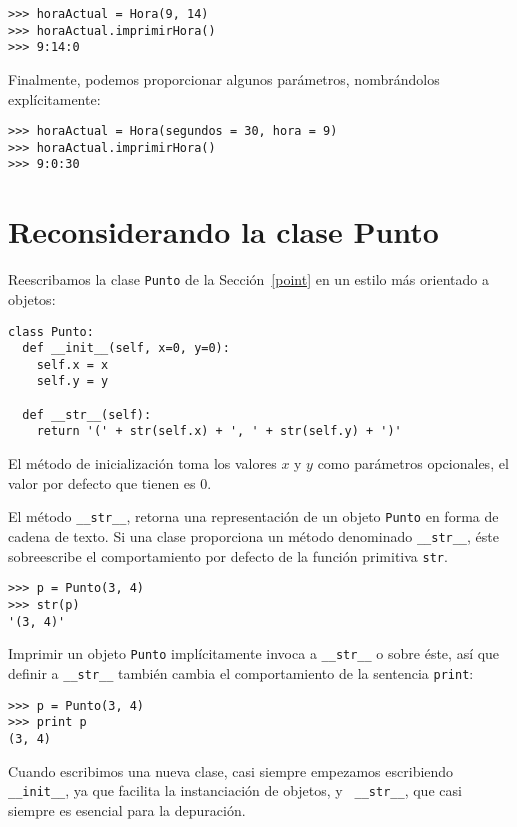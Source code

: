 \beforeverb
\begin{verbatim}
>>> horaActual = Hora(9, 14)
>>> horaActual.imprimirHora()
>>> 9:14:0
\end{verbatim}
\afterverb
%
Finalmente, podemos proporcionar algunos
parámetros, nombrándolos explícitamente:

\beforeverb
\begin{verbatim}
>>> horaActual = Hora(segundos = 30, hora = 9)
>>> horaActual.imprimirHora()
>>> 9:0:30
\end{verbatim}
\afterverb
%

\section{Reconsiderando la clase Punto}

Reescribamos la clase \texttt{Punto} de la Sección~\ref{point} 
en un estilo más orientado a objetos:

\beforeverb
\begin{verbatim}
class Punto:
  def __init__(self, x=0, y=0):
    self.x = x
    self.y = y

  def __str__(self):
    return '(' + str(self.x) + ', ' + str(self.y) + ')'
\end{verbatim}
\afterverb
%
El método de inicialización toma los valores  $x$ y $y$ como
parámetros opcionales, el valor por defecto que tienen es 0.

El método \texttt{\_\_str\_\_}, retorna una representación
de un objeto  \texttt{Punto} en forma de cadena de texto. Si
una clase proporciona un método denominado \texttt{\_\_str\_\_}, 
éste sobreescribe el comportamiento por defecto de la 
función primitiva  \texttt{str}.

\beforeverb
\begin{verbatim}
>>> p = Punto(3, 4)
>>> str(p)
'(3, 4)'
\end{verbatim}
\afterverb
%
Imprimir un objeto \texttt{Punto} implícitamente invoca a \texttt{\_\_str\_\_} o
sobre éste, así que definir a  \texttt{\_\_str\_\_} también cambia el 
comportamiento de la sentencia \texttt{print}:

\beforeverb
\begin{verbatim}
>>> p = Punto(3, 4)
>>> print p
(3, 4)
\end{verbatim}
\afterverb
%
Cuando escribimos una nueva clase, casi siempre empezamos escribiendo
 {\tt\_\_init\_\_}, ya que facilita la instanciación de objetos, y  {\tt
\_\_str\_\_}, que casi siempre es esencial para la depuración.


